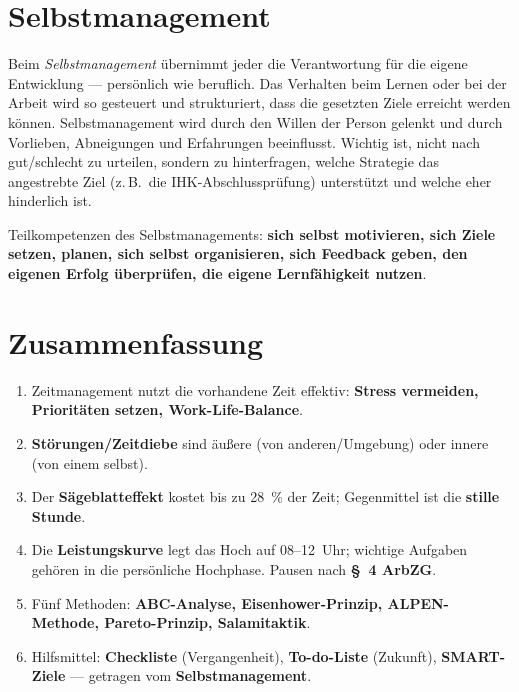 \documentclass[11pt, a4paper]{article}
\begin{document}
\section{Selbstmanagement}

Beim \emph{Selbstmanagement} übernimmt jeder die Verantwortung für die eigene
Entwicklung --- persönlich wie beruflich. Das Verhalten beim Lernen oder bei der Arbeit
wird so gesteuert und strukturiert, dass die gesetzten Ziele erreicht werden können.
Selbstmanagement wird durch den Willen der Person gelenkt und durch Vorlieben,
Abneigungen und Erfahrungen beeinflusst. Wichtig ist, nicht nach gut/schlecht zu
urteilen, sondern zu hinterfragen, welche Strategie das angestrebte Ziel (z.\,B.\ die
IHK-Abschlussprüfung) unterstützt und welche eher hinderlich ist.

\begin{merksatz}
Teilkompetenzen des Selbstmanagements: \textbf{sich selbst motivieren, sich Ziele setzen,
planen, sich selbst organisieren, sich Feedback geben, den eigenen Erfolg überprüfen, die
eigene Lernfähigkeit nutzen}.
\end{merksatz}

\section{Zusammenfassung}

\begin{enumerate}
  \item Zeitmanagement nutzt die vorhandene Zeit effektiv: \textbf{Stress vermeiden, Prioritäten setzen, Work-Life-Balance}.
  \item \textbf{Störungen/Zeitdiebe} sind äußere (von anderen/Umgebung) oder innere (von einem selbst).
  \item Der \textbf{Sägeblatteffekt} kostet bis zu 28~\% der Zeit; Gegenmittel ist die \textbf{stille Stunde}.
  \item Die \textbf{Leistungskurve} legt das Hoch auf 08--12~Uhr; wichtige Aufgaben gehören in die persönliche Hochphase. Pausen nach \textbf{§~4 ArbZG}.
  \item Fünf Methoden: \textbf{ABC-Analyse, Eisenhower-Prinzip, ALPEN-Methode, Pareto-Prinzip, Salamitaktik}.
  \item Hilfsmittel: \textbf{Checkliste} (Vergangenheit), \textbf{To-do-Liste} (Zukunft), \textbf{SMART-Ziele} --- getragen vom \textbf{Selbstmanagement}.
\end{enumerate}

\newpage
\end{document}
